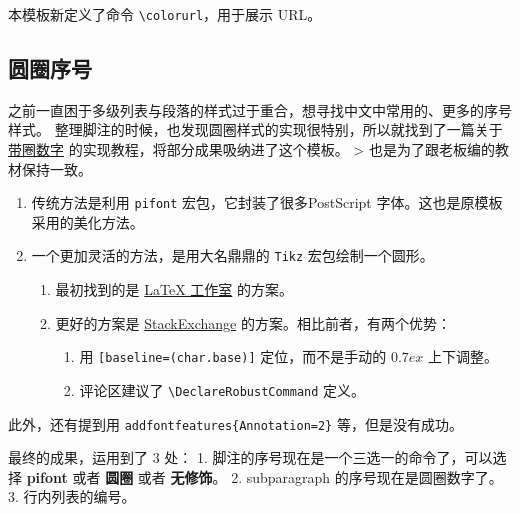 \documentclass[../Main/thesis.tex]{subfiles}
\begin{document}
本模板新定义了命令 \texttt{\textbackslash{}colorurl}，用于展示 URL。



\subsection{圆圈序号}

之前一直困于多级列表与段落的样式过于重合，想寻找中文中常用的、更多的序号样式。
整理脚注的时候，也发现圆圈样式的实现很特别，所以就找到了一篇关于
\href{https://stone-zeng.github.io/2019-02-09-circled-numbers/}{带圈数字}
的实现教程，将部分成果吸纳进了这个模板。 \textgreater{}
也是为了跟老板编的教材保持一致。

\begin{enumerate}
\item
  传统方法是利用 \texttt{pifont} 宏包，它封装了很多PostScript
  字体。这也是原模板采用的美化方法。
\item
  一个更加灵活的方法，是用大名鼎鼎的 \texttt{Tikz} 宏包绘制一个圆形。

  \begin{enumerate}
  \def\labelenumii{\arabic{enumii}.}
  \item
    最初找到的是
    \href{https://www.latexstudio.net/archives/1571.html}{LaTeX 工作室}
    的方案。
  \item
    更好的方案是
    \href{https://tex.stackexchange.com/questions/7032/good-way-to-make-textcircled-numbers\#}{StackExchange}
    的方案。相比前者，有两个优势：

    \begin{enumerate}
    \def\labelenumiii{\arabic{enumiii}.}
    \item
      用 \texttt{[baseline=(char.base)]} 定位，而不是手动的
      \(0.7ex\) 上下调整。
    \item
      评论区建议了 \texttt{\textbackslash{}DeclareRobustCommand} 定义。
    \end{enumerate}
  \end{enumerate}
\end{enumerate}

此外，还有提到用 \texttt{addfontfeatures\{Annotation=2\}}
等，但是没有成功。

最终的成果，运用到了 3 处： 1.
脚注的序号现在是一个三选一的命令了，可以选择 \textbf{pifont} 或者
\textbf{圆圈} 或者 \textbf{无修饰}。 2. subparagraph
的序号现在是圆圈数字了。 3. 行内列表的编号。
\end{document}
